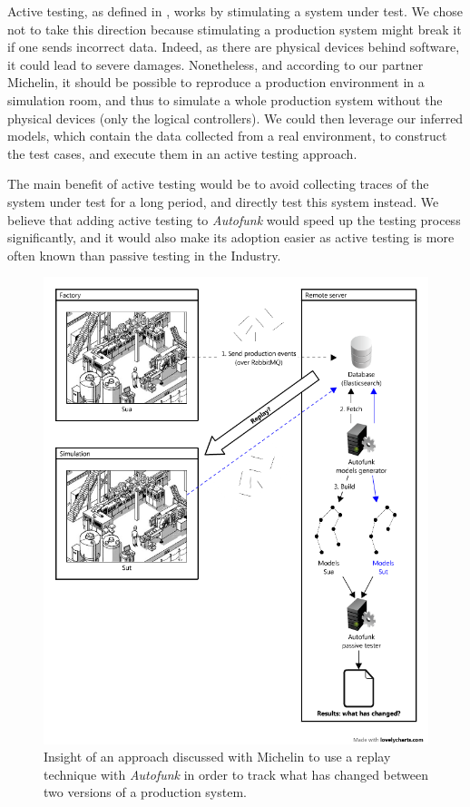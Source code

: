 Active testing, as defined in
,
works by stimulating a system under test. We chose not to take
this direction because stimulating a production system might
break it if one sends incorrect data. Indeed, as there are
physical devices behind software, it could lead to severe
damages.  Nonetheless, and according to our partner Michelin, it
should be possible to reproduce a production environment in a
simulation room, and thus to simulate a whole production system
without the physical devices (only the logical controllers). We
could then leverage our inferred models, which contain the data
collected from a real environment, to construct the test cases,
and execute them in an active testing approach.

The main benefit of active testing would be to avoid collecting
traces of the system under test for a long period, and directly
test this system instead. We believe that adding active testing
to \textit{Autofunk} would speed up the testing process
significantly, and it would also make its adoption easier as
active testing is more often known than passive testing in the
Industry.

\begin{figure}[ht]
    \begin{center}
        \includegraphics[width=0.8\linewidth]{figures/autofunk_active.png}
    \end{center}

    \caption{Insight of an approach discussed with Michelin to
    use a replay technique with \textit{Autofunk} in order to
    track what has changed between two versions of a production
    system.}
    \label{fig:autofunk_active}
\end{figure}

